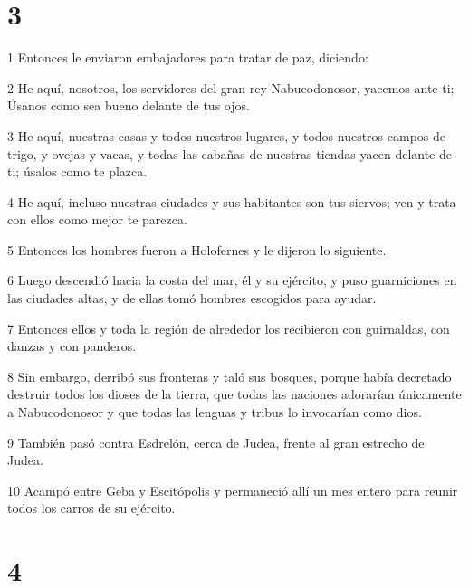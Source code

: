 \chapter{3}

\par 1 Entonces le enviaron embajadores para tratar de paz, diciendo:
\par 2 He aquí, nosotros, los servidores del gran rey Nabucodonosor, yacemos ante ti; Úsanos como sea bueno delante de tus ojos.
\par 3 He aquí, nuestras casas y todos nuestros lugares, y todos nuestros campos de trigo, y ovejas y vacas, y todas las cabañas de nuestras tiendas yacen delante de ti; úsalos como te plazca.
\par 4 He aquí, incluso nuestras ciudades y sus habitantes son tus siervos; ven y trata con ellos como mejor te parezca.
\par 5 Entonces los hombres fueron a Holofernes y le dijeron lo siguiente.
\par 6 Luego descendió hacia la costa del mar, él y su ejército, y puso guarniciones en las ciudades altas, y de ellas tomó hombres escogidos para ayudar.
\par 7 Entonces ellos y toda la región de alrededor los recibieron con guirnaldas, con danzas y con panderos.
\par 8 Sin embargo, derribó sus fronteras y taló sus bosques, porque había decretado destruir todos los dioses de la tierra, que todas las naciones adorarían únicamente a Nabucodonosor y que todas las lenguas y tribus lo invocarían como dios.
\par 9 También pasó contra Esdrelón, cerca de Judea, frente al gran estrecho de Judea.
\par 10 Acampó entre Geba y Escitópolis y permaneció allí un mes entero para reunir todos los carros de su ejército.

\chapter{4}

